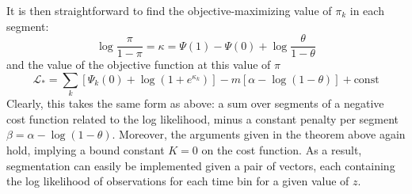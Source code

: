\documentclass[11pt]{article}
\begin{document}
It is then straightforward to find the objective-maximizing value of $\pi_k$ in each segment:
\begin{equation}
    \log \frac{\pi}{1 - \pi} = \kappa = \Psi(1) - \Psi(0) + \log \frac{\theta}{1 - \theta}
\end{equation}
and the value of the objective function at this value of $\pi$
\begin{equation}
    \mathcal{L}_* = \sum_k [\Psi_k(0) +
    \log (1 + e^{\kappa_k})] - m [\alpha - \log (1 - \theta)] + \text{const}
\end{equation}
Clearly, this takes the same form as above: a sum over segments of a negative cost function related to the log likelihood, minus a constant penalty per segment $\beta = \alpha - \log (1 - \theta)$. Moreover, the arguments given in the theorem above again hold, implying a bound constant $K = 0$ on the cost function. As a result, segmentation can easily be implemented given a pair of vectors, each containing the log likelihood of observations for each time bin for a given value of $z$.
\end{document}
